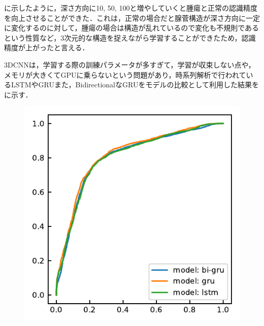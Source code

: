 に示したように，深さ方向に10, 50, 100と増やしていくと腫瘍と正常の認識精度を向上させることができた．これは，正常の場合だと腺菅構造が深さ方向に一定に変化するのに対して，腫瘍の場合は構造が乱れているので変化も不規則であるという性質など，3次元的な構造を捉えながら学習することができたため，認識精度が上がったと言える．

3DCNNは，学習する際の訓練パラメータが多すぎて，学習が収束しない点や，メモリが大きくてGPUに乗らないという問題があり，時系列解析で行われているLSTMやGRUまた，BidirectionalなGRUをモデルの比較として利用した結果をに示す．

\begin{figure}[H]
	\centering
	
	\begin{minipage}[b]{0.3\columnwidth}
		\centering
		\includegraphics[clip, width=\linewidth]{fig/chapter4/3d/roc/depth_10.pdf}
		\label{fig:}
	\end{minipage}
	\begin{minipage}[b]{0.3\columnwidth}
		\centering

\end{minipage}
\end{figure}
